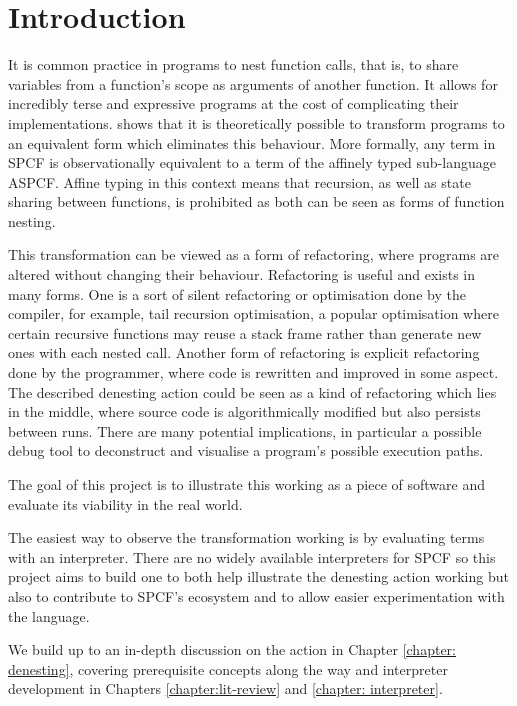 \documentclass[12pt,a4paper]{report}
\theoremstyle{definition}
\theoremstyle{definition}
\theoremstyle{remark}
\begin{document}
\newpage
\setcounter{page}{1}
\chapter{Introduction}
It is common practice in programs to nest function calls, that is, to share variables from a function's scope as arguments of another function. It allows for incredibly terse and expressive programs at the cost of complicating their implementations. \cite{laird_2007} shows that it is theoretically possible to transform programs to an equivalent form which eliminates this behaviour. More formally, any term in SPCF is observationally equivalent to a term of the affinely typed sub-language ASPCF. Affine typing in this context means that recursion, as well as state sharing between functions, is prohibited as both can be seen as forms of function nesting. 

This transformation can be viewed as a form of refactoring, where programs are altered without changing their behaviour. Refactoring is useful and exists in many forms. One is a sort of silent refactoring or optimisation done by the compiler, for example, tail recursion optimisation, a popular optimisation where certain recursive functions may reuse a stack frame rather than generate new ones with each nested call. Another form of refactoring is explicit refactoring done by the programmer, where code is rewritten and improved in some aspect. The described denesting action could be seen as a kind of refactoring which lies in the middle, where source code is algorithmically modified but also persists between runs. There are many potential implications, in particular a possible debug tool to deconstruct and visualise a program's possible execution paths.

The goal of this project is to illustrate this working as a piece of software and evaluate its viability in the real world.

The easiest way to observe the transformation working is by evaluating terms with an interpreter. There are no widely available interpreters for SPCF so this project aims to build one to both help illustrate the denesting action working but also to contribute to SPCF's ecosystem and to allow easier experimentation with the language.

 We build up to an in-depth discussion on the action in Chapter \ref{chapter: denesting}, covering prerequisite concepts along the way and interpreter development in Chapters \ref{chapter:lit-review} and \ref{chapter: interpreter}.
\end{document}
